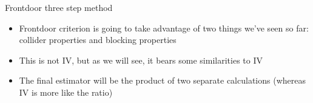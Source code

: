 \documentclass{beamer}
\begin{document}
\begin{frame}{Frontdoor three step method}

  \begin{center}
  \end{center}

  \begin{itemize}

    \item Frontdoor criterion is going to take advantage of two things we've seen so far: collider properties and blocking properties
    \item This is not IV, but as we will see, it bears some similarities to IV
    \item The final estimator will be the product of two separate calculations (whereas IV is more like the ratio)
  \end{itemize}

\end{frame}
\end{document}
